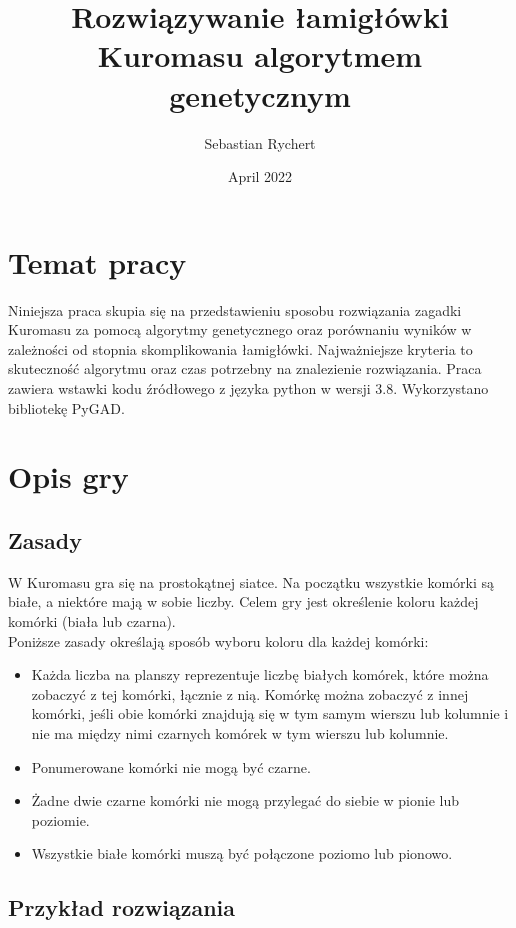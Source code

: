 \documentclass{article}
\title{Rozwiązywanie łamigłówki Kuromasu algorytmem genetycznym}
\author{Sebastian Rychert}
\date{April 2022}
\begin{document}
\maketitle

\tableofcontents
\clearpage

\section{Temat pracy}
Niniejsza praca skupia się na przedstawieniu sposobu rozwiązania zagadki Kuromasu za pomocą algorytmy genetycznego oraz porównaniu wyników w zależności od stopnia skomplikowania łamigłówki. Najważniejsze kryteria to skuteczność algorytmu oraz czas potrzebny na znalezienie rozwiązania. Praca zawiera wstawki kodu źródłowego z języka python w wersji 3.8. Wykorzystano bibliotekę PyGAD.

\section{Opis gry}
\subsection{Zasady}
W Kuromasu gra się na prostokątnej siatce. Na początku wszystkie komórki są białe, a niektóre mają w sobie liczby. Celem gry jest określenie koloru każdej komórki (biała lub czarna).\\
\newline
Poniższe zasady określają sposób wyboru koloru dla każdej komórki:

\begin{itemize}
  \item Każda liczba na planszy reprezentuje liczbę białych komórek, które można zobaczyć z tej komórki, łącznie z nią. Komórkę można zobaczyć z innej komórki, jeśli obie komórki znajdują się w tym samym wierszu lub kolumnie i nie ma między nimi czarnych komórek w tym wierszu lub kolumnie.
  \item Ponumerowane komórki nie mogą być czarne.
  \item Żadne dwie czarne komórki nie mogą przylegać do siebie w pionie lub poziomie.
  \item Wszystkie białe komórki muszą być połączone poziomo lub pionowo.
\end{itemize}

\subsection{Przykład rozwiązania}
\vspace{1cm}
\end{document}
